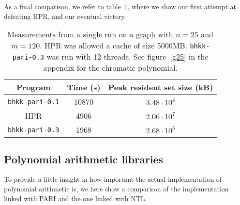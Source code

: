 \documentclass{cslthse-msc}
\newcommand{\code}{\texttt}
\begin{document}
As a final comparison, we refer to table~\ref{improvements}, where we show our first attempt at defeating HPR, and our eventual victory.

\begin{table}[H]\centering
\begin{tabular}{c|cc} \hline
  Program & Time (s) & Peak resident set size (kB) \\ \hline
  \code{bhkk-pari-0.1} & 10870 & $3.48 \cdot 10^{4}$ \\ \hline
  HPR & 4906 & $2.06 \cdot 10^{7}$ \\ \hline
  \code{bhkk-pari-0.3} & 1968 & $2.68 \cdot 10^{5}$ \\ \hline
\end{tabular}
\caption{Measurements from a single run on a graph with $n = 25$ and $m = 120$. HPR was allowed a cache of size 5000MB. \code{bhkk-pari-0.3} was run with 12 threads. See figure~\ref{g25} in the appendix for the chromatic polynomial.}
\label{improvements}
\end{table}


\subsection{Polynomial arithmetic libraries}
To provide a little insight in how important the actual implementation of polynomial arithmetic is, we here show a comparison of the implementation linked with PARI and the one linked with NTL.
\end{document}
